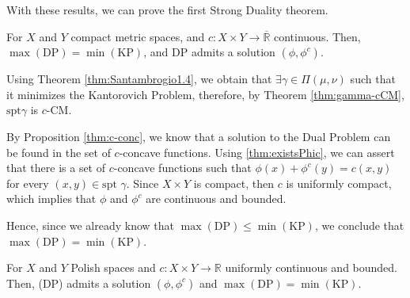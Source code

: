 \vspace{5mm}
With these results, we can prove the first Strong Duality theorem.

\begin{theorem}
  For $X$ and $Y$ compact metric spaces, and $c:X \times Y \to
    \overline{\mathbb R}$ continuous. Then, $\max\mathrm{(DP)} = \mathrm{\min(KP)}$,
    and DP admits a solution $(\phi,\phi^c)$.
  \label{thm:compactstrongduality}
\end{theorem}
\begin{prf}
  Using Theorem \ref{thm:Santambrogio1.4}, we obtain that $\exists \gamma \in \Pi(\mu,\nu)$
  such that it minimizes the Kantorovich Problem, therefore, by Theorem \ref{thm:gamma-cCM},
  $\text{spt}\gamma$ is $c$-CM.

  By Proposition \ref{thm:c-conc}, we know that a solution to the Dual Problem
  can be found in the set of $c$-concave functions.
  Using \ref{thm:existsPhic}, we can assert that there is a set of $c$-concave
  functions such that $\phi(x)+\phi^c(y) = c(x,y)$ for every $(x,y) \in \text{spt }\gamma$.
  Since $X\times Y$ is compact, then $c$ is uniformly compact, which implies that
  $\phi$ and $\phi^c$ are continuous and bounded.

  Hence, since we already know that $\mathrm{\max(DP)} \leq \mathrm{\min(KP)}$, we conclude that
  $\mathrm{\max(DP)} = \mathrm{\min(KP)}$.
\end{prf}

\begin{theorem}
  For $X$ and $Y$ Polish spaces and $c:X\times Y \to \mathbb R$ uniformly continuous and bounded. Then,
  (DP) admits a solution $(\phi,\phi^c)$ and $\mathrm{\max(DP)}=\mathrm{\min (KP)}$.
  \label{thm:polishStrongDuality}
\end{theorem}

